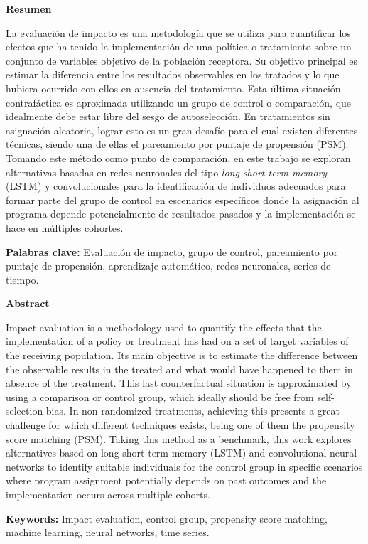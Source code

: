 \documentclass[../main.tex]{subfiles}
\begin{document}
\noindent \textbf{Resumen}

La evaluación de impacto es una metodología que se utiliza para cuantificar los efectos
que ha tenido la implementación de una política o tratamiento sobre un conjunto de
variables objetivo de la población receptora. Su objetivo principal es estimar la
diferencia entre los resultados observables en los tratados y lo que hubiera ocurrido con
ellos en ausencia del tratamiento. Esta última situación contrafáctica es aproximada
utilizando un grupo de control o comparación, que idealmente debe estar libre del sesgo de
autoselección. En tratamientos sin asignación aleatoria, lograr esto es un gran desafío
para el cual existen diferentes técnicas, siendo una de ellas el pareamiento por puntaje
de propensión (PSM). Tomando este método como punto de comparación, en este trabajo se
exploran alternativas basadas en redes neuronales del tipo \textit{long short-term memory}
(LSTM) y convolucionales para la identificación de individuos adecuados para formar parte
del grupo de control en escenarios específicos donde la asignación al programa depende
potencialmente de resultados pasados y la implementación se hace en múltiples cohortes.

\medskip

\noindent \textbf{Palabras clave: } Evaluación de impacto, grupo de control, pareamiento
por puntaje de propensión, aprendizaje automático, redes neuronales, series de tiempo.

\bigskip
\bigskip

\noindent \textbf{Abstract}

Impact evaluation is a methodology used to quantify the effects that the implementation
of a policy or treatment has had on a set of target variables of the receiving population.
Its main objective is to estimate the difference between the observable results in the
treated and what would have happened to them in absence of the treatment. This last
counterfactual situation is approximated by using a comparison or control group, which
ideally should be free from self-selection bias. In non-randomized treatments, achieving
this presents a great challenge for which different techniques exists, being one of them
the propensity score matching (PSM). Taking this method as a benchmark, this work explores
alternatives based on long short-term memory (LSTM) and convolutional neural networks to
identify suitable individuals for the control group in specific scenarios where program
assignment potentially depends on past outcomes and the implementation occurs across
multiple cohorts.

\medskip

\noindent \textbf{Keywords: } Impact evaluation, control group, propensity score matching,
machine learning, neural networks, time series.
\end{document}
